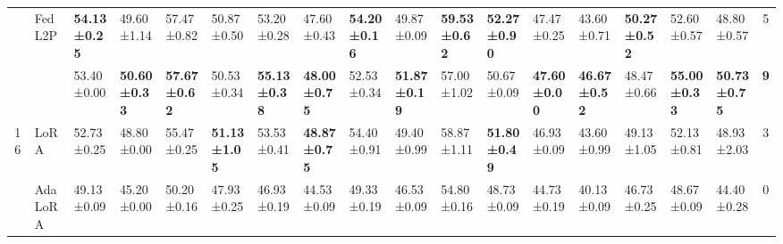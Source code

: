 \begin{table*}[t]
\begin{scriptsize}
{\begin{tabular}{c|l|l|l|l|l|l|l|l|l|l|l|l|l|l|l|l|c}
                    & FedL2P                               & \textbf{54.13±0.25}              & 49.60±1.14                        & 57.47±0.82                       & 50.87±0.50                       & 53.20±0.28                        & 47.60±0.43                        & \textbf{54.20±0.16}               & 49.87±0.09                       & \textbf{59.53±0.62}              & \textbf{52.27±0.90}              & 47.47±0.25                       & 43.60±0.71                        & \textbf{50.27±0.52}              & 52.60±0.57                        & 48.80±0.57                        & 5             \\ %
                    & \method{}                                 & 53.40±0.00                        & \textbf{50.60±0.33}               & \textbf{57.67±0.62}              & 50.53±0.34                       & \textbf{55.13±0.38}              & \textbf{48.00±0.75}               & 52.53±0.34                       & \textbf{51.87±0.19}              & 57.00±1.02                        & 50.67±0.09                       & \textbf{47.60±0.00}               & \textbf{46.67±0.52}              & 48.47±0.66                       & \textbf{55.00±0.33}               & \textbf{50.73±0.75}              & \textbf{9}    \\ \hline
\multirow{5}{*}{16} & LoRA                                   & 52.73±0.25                       & 48.80±0.00                        & 55.47±0.25                       & \textbf{51.13±1.05}              & 53.53±0.41                       & \textbf{48.87±0.75}              & 54.40±0.91                        & 49.40±0.99                        & 58.87±1.11                       & \textbf{51.80±0.49}               & 46.93±0.09                       & 43.60±0.99                        & 49.13±1.05                       & 52.13±0.81                       & 48.93±2.03                       & 3             \\ %
                    & AdaLoRA                              & 49.13±0.09                       & 45.20±0.00                        & 50.20±0.16                        & 47.93±0.25                       & 46.93±0.19                       & 44.53±0.09                       & 49.33±0.19                       & 46.53±0.09                       & 54.80±0.16                        & 48.73±0.09                       & 44.73±0.19                       & 40.13±0.09                       & 46.73±0.25                       & 48.67±0.09                       & 44.40±0.28                        & 0             \\ %

\end{tabular}}
\end{scriptsize}
\end{table*}
